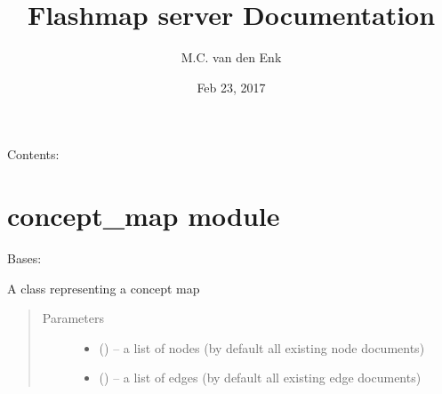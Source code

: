 \documentclass[letterpaper,10pt,english]{sphinxmanual}
\title{Flashmap server Documentation}
\date{Feb 23, 2017}
\author{M.C. van den Enk}
\begin{document}
\maketitle
\sphinxtableofcontents
{}\label{\detokenize{index::doc}}


Contents:


\chapter{concept\_map module}
\label{\detokenize{concept_map:welcome-to-flashmap-server-s-documentation}}\label{\detokenize{concept_map:concept-map-module}}\label{\detokenize{concept_map::doc}}\label{\detokenize{concept_map:module-concept_map}}

\begin{fulllineitems}
\label{\detokenize{concept_map:concept_map.ConceptMap}}
Bases: 

A class representing a concept map
\begin{quote}\begin{description}
\item[{Parameters}] \leavevmode\begin{itemize}
\item {} 
 (\href{https://docs.python.org/2/library/functions.html\#list}{}\sphinxstyleliteralemphasis{)}\sphinxstyleliteralemphasis{}) -- a list of nodes (by default all existing node documents)

\item {} 
 (\href{https://docs.python.org/2/library/functions.html\#list}{}\sphinxstyleliteralemphasis{)}\sphinxstyleliteralemphasis{}) -- a list of edges (by default all existing edge documents)

\end{itemize}

\end{description}\end{quote}


\end{fulllineitems}
\end{document}
